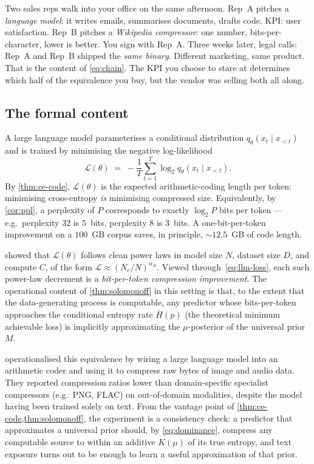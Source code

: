 \documentclass[12pt,a4paper]{article}
\theoremstyle{plain}
\theoremstyle{definition}
\begin{document}
\begin{story}
Two sales reps walk into your office on the same afternoon.  Rep~A
pitches a \emph{language model}: it writes emails, summarises
documents, drafts code.  KPI: user satisfaction.  Rep~B pitches a
\emph{Wikipedia compressor}: one number, bits-per-character, lower
is better.  You sign with Rep~A.  Three weeks later, legal calls:
Rep~A and Rep~B shipped the \emph{same binary}.  Different
marketing, same product.  That is the content of \cref{eq:chain}.
The KPI you choose to stare at determines which half of the
equivalence you buy, but the vendor was selling both all along.
\end{story}

\subsection*{The formal content}

A large language model parameterises a conditional distribution
$q_\theta(x_t \mid x_{<t})$ and is trained by minimising the
negative log-likelihood
\begin{equation}
  \mathcal{L}(\theta)
  \;=\; -\frac{1}{T}\sum_{t=1}^{T} \log_2 q_\theta(x_t \mid x_{<t}).
  \label{eq:llm-loss}
\end{equation}
By \cref{thm:ce-code}, $\mathcal{L}(\theta)$ is the expected
arithmetic-coding length per token: minimising cross-entropy
\emph{is} minimising compressed size.  Equivalently, by
\cref{cor:ppl}, a perplexity of $P$ corresponds to exactly
$\log_2 P$ bits per token --- e.g.\ perplexity $32$ is $5$~bits,
perplexity $8$ is $3$~bits.  A one-bit-per-token improvement on a
$100$~GB corpus saves, in principle, $\sim 12.5$~GB of code length.

\citet{kaplan2020scaling} showed that $\mathcal{L}(\theta)$ follows
clean power laws in model size $N$, dataset size $D$, and compute
$C$, of the form $\mathcal{L} \approx (N_c / N)^{\alpha_N}$.
Viewed through~\eqref{eq:llm-loss}, each such power-law decrement
is a \emph{bit-per-token compression improvement}.  The
operational content of \cref{thm:solomonoff} in this setting is
that, to the extent that the data-generating process is
computable, any predictor whose bits-per-token approaches the
conditional entropy rate $\overline{H}(p)$ (the theoretical
minimum achievable loss) is implicitly approximating the
$\mu$-posterior of the universal prior $M$.

\citet{deletang2024language} operationalised this equivalence by
wiring a large language model into an arithmetic coder and using
it to compress raw bytes of image and audio data.  They reported
compression ratios lower than domain-specific specialist
compressors (e.g.\ PNG, FLAC) on out-of-domain modalities, despite
the model having been trained solely on text.  From the vantage
point of \cref{thm:ce-code,thm:solomonoff}, the experiment is a
consistency check: a predictor that approximates a universal prior
should, by \eqref{eq:dominance}, compress any computable source to
within an additive $K(\mu)$ of its true entropy, and text exposure
turns out to be enough to learn a useful approximation of that
prior.
\end{document}
